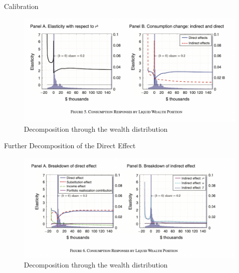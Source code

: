 \documentclass[english,xcolor=svgnames]{beamer}
\begin{document}
\begin{frame}{Calibration}
\begin{figure}
\includegraphics[scale=0.35]{figures/kmv_7}\\
Decomposition through the wealth distribution
\end{figure}
\end{frame}



\begin{frame}{Further Decomposition of the Direct Effect}
\begin{figure}
\includegraphics[scale=0.35]{figures/kmv_11}\\
Decomposition through the wealth distribution
\end{figure}
\end{frame}
\end{document}
